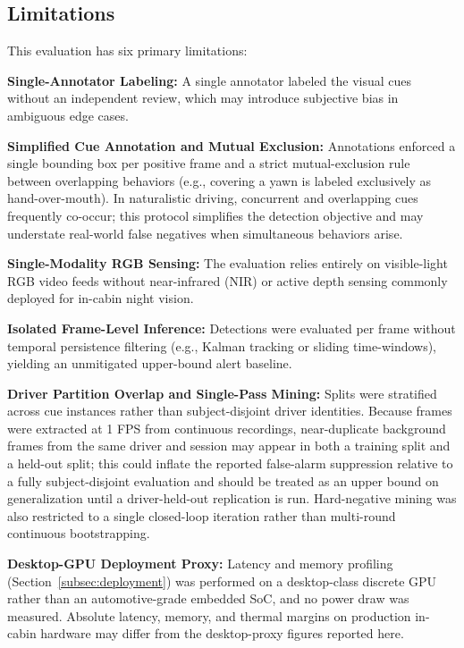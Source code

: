 \documentclass[conference]{IEEEtran}
\begin{document}
\subsection{Limitations}
\label{subsec:limitations}
This evaluation has six primary limitations:

\textbf{Single-Annotator Labeling:} A single annotator labeled the visual cues without an independent review, which may introduce subjective bias in ambiguous edge cases.

\textbf{Simplified Cue Annotation and Mutual Exclusion:} Annotations enforced a single bounding box per positive frame and a strict mutual-exclusion rule between overlapping behaviors (e.g., covering a yawn is labeled exclusively as hand-over-mouth). In naturalistic driving, concurrent and overlapping cues frequently co-occur; this protocol simplifies the detection objective and may understate real-world false negatives when simultaneous behaviors arise.

\textbf{Single-Modality RGB Sensing:} The evaluation relies entirely on visible-light RGB video feeds without near-infrared (NIR) or active depth sensing commonly deployed for in-cabin night vision.

\textbf{Isolated Frame-Level Inference:} Detections were evaluated per frame without temporal persistence filtering (e.g., Kalman tracking or sliding time-windows), yielding an unmitigated upper-bound alert baseline.

\textbf{Driver Partition Overlap and Single-Pass Mining:} Splits were stratified across cue instances rather than subject-disjoint driver identities. Because frames were extracted at 1 FPS from continuous recordings, near-duplicate background frames from the same driver and session may appear in both a training split and a held-out split; this could inflate the reported false-alarm suppression relative to a fully subject-disjoint evaluation and should be treated as an upper bound on generalization until a driver-held-out replication is run. Hard-negative mining was also restricted to a single closed-loop iteration rather than multi-round continuous bootstrapping.

\textbf{Desktop-GPU Deployment Proxy:} Latency and memory profiling (Section~\ref{subsec:deployment}) was performed on a desktop-class discrete GPU rather than an automotive-grade embedded SoC, and no power draw was measured. Absolute latency, memory, and thermal margins on production in-cabin hardware may differ from the desktop-proxy figures reported here.
\end{document}
